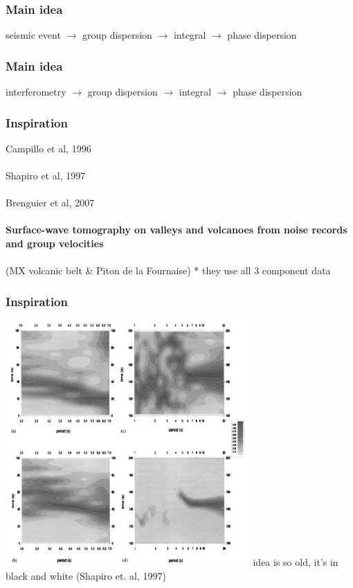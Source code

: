 \documentclass{beamer}
\begin{document}
\frame
{
\frametitle{{\bf Main idea}}
\centering
seismic event $\to$ group dispersion $\to$ integral $\to$ phase dispersion
}
\frame
{
\frametitle{{\bf Main idea}}
\centering
interferometry $\to$ group dispersion $\to$ integral $\to$ phase dispersion
}
\frame
{
\frametitle{{\bf Inspiration}}
Campillo et al, 1996\\~\\
Shapiro et al, 1997\\~\\
Brenguier et al, 2007\\~\\
\centering
{\bf Surface-wave tomography on valleys and volcanoes from noise records and group velocities} \\~\\
(MX volcanic belt \& Piton de la Fournaise)
\vfill
\flushleft
* they use all 3 component data
}
\frame
{
\frametitle{{\bf Inspiration}}
\centering
\includegraphics[width=0.7\textwidth]{../pics/idea/ftan-mex.png}
\vfill
idea is so old, it's in black and white (Shapiro et. al, 1997)
}
\end{document}
